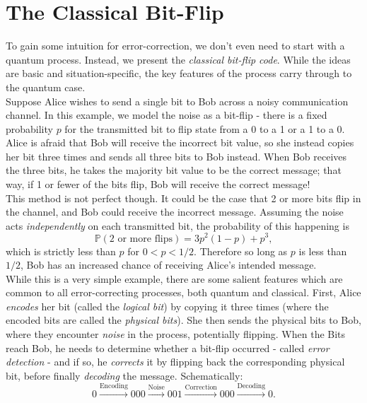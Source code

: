 \documentclass[12pt,a4paper]{report}
\numberwithin{equation}{section}
\theoremstyle{definition}
\theoremstyle{theorem}
\theoremstyle{theorem}
\theoremstyle{example}
\theoremstyle{definition}
\begin{document}
\section{The Classical Bit-Flip}
To gain some intuition for error-correction, we don't even need to start with a quantum process. Instead, we present the \textit{classical bit-flip code}. While the ideas are basic and situation-specific, the key features of the process carry through to the quantum case.\\
Suppose Alice wishes to send a single bit to Bob across a noisy communication channel. In this example, we model the noise as a bit-flip - there is a fixed probability $p$ for the transmitted bit to flip state from a 0 to a 1 or a 1 to a 0. Alice is afraid that Bob will receive the incorrect bit value, so she instead copies her bit three times and sends all three bits to Bob instead. When Bob receives the three bits, he takes the majority bit value to be the correct message; that way, if 1 or fewer of the bits flip, Bob will receive the correct message!\\
This method is not perfect though. It could be the case that 2 or more bits flip in the channel, and Bob could receive the incorrect message. Assuming the noise acts \textit{independently} on each transmitted bit, the probability of this happening is
\begin{equation}
	\mathbb{P}(\text{2 or more flips})=3p^{2}(1-p)+p^{3},
\end{equation}
which is strictly less than $p$ for $0<p<1/2$. Therefore so long as $p$ is less than $1/2$, Bob has an increased chance of receiving Alice's intended message.\\
While this is a very simple example, there are some salient features which are common to all error-correcting processes, both quantum and classical. First, Alice \textit{encodes} her bit (called the \textit{logical bit}) by copying it three times (where the encoded bits are called the \textit{physical bits}). She then sends the physical bits to Bob, where they encounter \textit{noise} in the process, potentially flipping. When the Bits reach Bob, he needs to determine whether a bit-flip occurred - called \textit{error detection} - and if so, he \textit{corrects} it by flipping back the corresponding physical bit, before finally \textit{decoding} the message. Schematically:
\begin{equation*}
	0\xrightarrow{\text{Encoding}}000\xrightarrow{\text{Noise}}001\xrightarrow{\text{Correction}}000\xrightarrow{\text{Decoding}}0.
\end{equation*}
\end{document}
